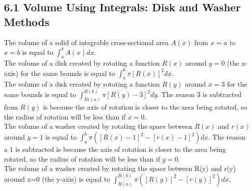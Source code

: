 \documentclass{article}
\begin{document}
        \subsection*{6.1 Volume Using Integrals: Disk and Washer Methods}
            The volume of a solid of integrable cross-sectional area $A(x)$ from $x=a$ to $x=b$ is equal to $\int_{a}^{b} A(x)dx$. \\
            The volume of a disk created by rotating a function $R(x)$ around $y=0$ (the x-axis) for the same bounds is equal to $\int_{a}^{b} \pi [R(x)]^2 dx$. \\
            The volume of a disk created by rotating a function $R(y)$ around $x=3$ for the same bounds is equal to $\int_{R((a)}^{R(b)} \pi [R(y)-3]^2 dy$. The reason 3 is subtracted from $R(y)$ is because the axis of rotation is closer to the area being rotated, so the radius of rotation will be less than if $x=0$.\\
            The volume of a washer created by rotating the space between $R(x)$ and $r(x)$ around $y=1$ is equal to $\int_{a}^{b} \pi ([R(x) - 1]^2 - [r(x) - 1]^2) dx$. The reason a 1 is subtracted is because the axis of rotation is closer to the area being rotated, so the radius of rotation will be less than if $y=0$. \\
            The volume of a washer created by rotating the space between R(y) and r(y) around x=0 (the y-axis) is equal to $\int_{R(a)}^{R(b)} \pi ([R(y)]^2 - [r(y)]^2) dx$. \\
        \color{Orange}
\end{document}
